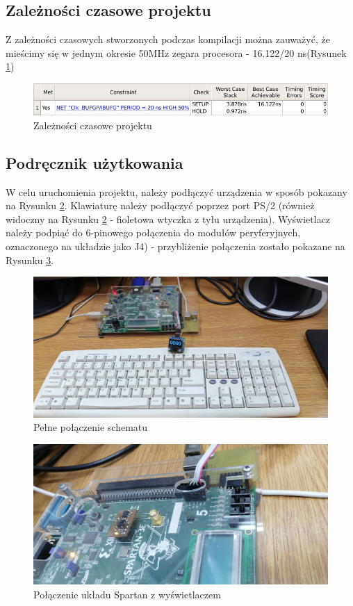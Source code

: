 \documentclass[]{article}
\begin{document}
	\subsection{Zależności czasowe projektu}
	Z zależności czasowych stworzonych podczas kompilacji można zauważyć, że mieścimy się w jednym okresie 50MHz zegara procesora - 16.122/20 ns(Rysunek \ref{fig:time})
	\begin{figure}[H]
		\includegraphics[width=\linewidth]{img/time_constraints.jpg}
		\caption{Zależności czasowe projektu}
		\label{fig:time}
	\end{figure}
	
	\subsection{Podręcznik użytkowania}
	W celu uruchomienia projektu, należy podłączyć urządzenia w sposób pokazany na Rysunku \ref{fig:all}. Klawiaturę należy podłączyć poprzez port PS/2 (również widoczny na Rysunku \ref{fig:all} - fioletowa wtyczka z tyłu urządzenia). Wyświetlacz należy podpiąć do 6-pinowego połączenia do modułów peryferyjnych, oznaczonego na układzie jako J4) - przybliżenie połączenia zostało pokazane na Rysunku \ref{fig:j4}.
	\begin{figure}[H]
		\includegraphics[width=\linewidth]{img/all.jpg}
		\caption{Pełne połączenie schematu}
		\label{fig:all}
	\end{figure}
	\begin{figure}[H]
		\includegraphics[width=\linewidth]{img/connection.jpg}
		\caption{Połączenie układu Spartan z wyświetlaczem}
		\label{fig:j4}
	\end{figure}
\end{document}
